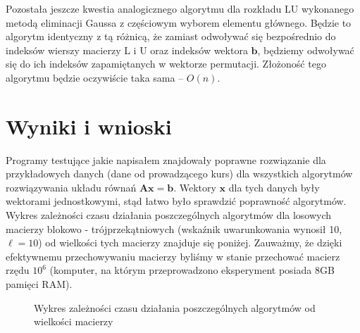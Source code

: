 \documentclass[]{article}
\newcommand{\mA}{\bm{A}}
\newcommand{\vb}{\bm{b}}
\newcommand{\vx}{\bm{x}}
\begin{document}
	Pozostała jeszcze kwestia analogicznego algorytmu dla rozkładu LU wykonanego metodą eliminacji Gaussa z częściowym wyborem elementu głównego. Będzie to algorytm identyczny z tą różnicą, że zamiast odwoływać się bezpośrednio do indeksów wierszy macierzy L i U oraz indeksów wektora $\vb$, będziemy odwoływać się do ich indeksów zapamiętanych w wektorze permutacji. Złożoność tego algorytmu będzie oczywiście taka sama -- $O(n)$.
	
	\section*{Wyniki i wnioski}
	
	Programy testujące jakie napisałem znajdowały poprawne rozwiązanie dla przykładowych danych (dane od prowadzącego kurs) dla wszystkich algorytmów rozwiązywania układu równań $\mA\vx=\vb$. Wektory $\vx$ dla tych danych były wektorami jednostkowymi, stąd łatwo było sprawdzić poprawność algorytmów.\\
	
	Wykres zależności czasu działania poszczególnych algorytmów dla losowych macierzy blokowo - trójprzekątniowych (wskaźnik uwarunkowania wynosił 10, $\ell=10$) od wielkości tych macierzy znajduje się poniżej. Zauważmy, że dzięki efektywnemu przechowywaniu macierzy byliśmy w stanie przechować macierz rzędu $10^6$ (komputer, na którym przeprowadzono eksperyment posiada 8GB pamięci RAM).

\begin{figure}[h]
	\centering
	 \hfill
	\caption*{Wykres zależności czasu działania poszczególnych algorytmów od wielkości macierzy}
\end{figure}		
\end{document}

